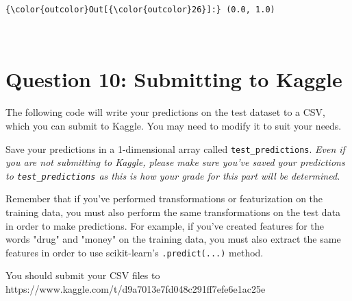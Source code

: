 \documentclass[11pt]{article}
\begin{document}
\begin{Verbatim}[commandchars=\\\{\}]
{\color{outcolor}Out[{\color{outcolor}26}]:} (0.0, 1.0)
\end{Verbatim}
            
    \begin{center}
    \end{center}
    { \hspace*{\fill} \\}
    
    \section{Question 10: Submitting to
Kaggle}\label{question-10-submitting-to-kaggle}

The following code will write your predictions on the test dataset to a
CSV, which you can submit to Kaggle. You may need to modify it to suit
your needs.

Save your predictions in a 1-dimensional array called
\texttt{test\_predictions}. \emph{Even if you are not submitting to
Kaggle, please make sure you've saved your predictions to
\texttt{test\_predictions} as this is how your grade for this part will
be determined.}

Remember that if you've performed transformations or featurization on
the training data, you must also perform the same transformations on the
test data in order to make predictions. For example, if you've created
features for the words "drug" and "money" on the training data, you must
also extract the same features in order to use scikit-learn's
\texttt{.predict(...)} method.

You should submit your CSV files to
https://www.kaggle.com/t/d9a7013e7fd048c291ff7efe6e1ac25e
\end{document}
